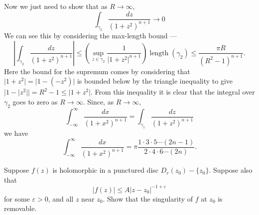 \documentclass[12 pt, letterpaper]{hmcpset}
\begin{document}
\begin{solution}
	Now we just need to show that as $R \to \infty$,
	\[
		\int_{\gamma_{2}} \frac{dz}{(1 + z^{2})^{n + 1}} \to 0
	\]
	We can see this by considering the max-length bound ---
	 \[
		\left \lvert \int_{\gamma_{2}} \frac{dz}{(1 + z^{2})^{n + 1}} \right \rvert \le \left ( \sup_{z \in \gamma_{2}} \frac{1}{\lvert 1 + z^{2} \rvert^{n + 1}} \right ) \operatorname{length}(\gamma_{2}) \le \frac{\pi R}{(R^{2} - 1)^{n + 1}}.
	\]
	Here the bound for the supremum comes by considering that $\lvert 1 + z^{2} \rvert = \lvert 1 - (- z^{2}) \rvert$ is bounded below by the triangle inequality to give $\lvert 1 - \lvert z^{2} \rvert \rvert = R^{2} - 1 \le \lvert 1 + z^{2} \rvert$. From this inequality it is clear that the integral over  $\gamma_{2}$ goes to zero as $R \to \infty$. Since, as $R \to \infty$,
	\[
		\int_{- \infty}^{\infty} \frac{dx}{(1 + x^{2})^{n + 1}} = \int_{\gamma_{1}} \frac{dz}{(1 + z^{2})^{n + 1}}
	\]
	we have
	\[
		\int_{- \infty}^{\infty} \frac{dx}{(1 + x^{2})^{n + 1}} = \pi \frac{1 \cdot 3 \cdot 5 \cdots (2n - 1)}{2 \cdot 4 \cdot 6 \cdots (2n)}.
	\]
\end{solution}

\pagebreak

\begin{problem}[13]
	Suppose $f(z)$ is holomorphic in a punctured disc $D_{r}(z_{0}) - \{ z_{0} \}$. Suppose also that
	\[
		\lvert f(z) \rvert \le A \lvert z - z_{0} \rvert^{-1 + \varepsilon}
	\]
	for some $\varepsilon > 0$, and all $z$ near $z_{0}$. Show that the singularity of $f$ at $z_{0}$ is removable.
\end{problem}
\end{document}
